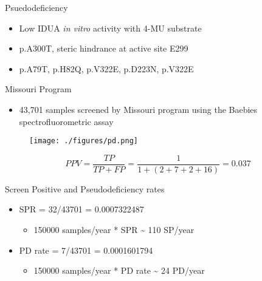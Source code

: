 \documentclass[presentation, smaller]{beamer}
\begin{document}
\begin{frame}[label={sec:orgf42741b}]{Psuedodeficiency}
\begin{itemize}
\item Low IDUA \emph{in vitro} activity with 4-MU substrate
\item p.A300T, steric hindrance at active site E299
\item p.A79T, p.H82Q, p.V322E, p.D223N, p.V322E
\end{itemize}
\end{frame}


\begin{frame}[label={sec:orgba49197}]{Missouri Program}
\begin{itemize}
\item 43,701 samples screened by Missouri program using the Baebies spectrofluorometric assay
\end{itemize}

\begin{figure}[htbp]
\centering
\texttt{[image: ./figures/pd.png]}
\label{fig:org65621ab}
\end{figure}


\[
 PPV = \frac{TP}{TP + FP}  = \frac{1}{1 + (2 + 7 + 2 + 16)} = 0.037
\]

\begin{block}{Screen Positive and Pseudodeficiency rates}
\begin{itemize}
\item SPR = 32/43701 =  0.0007322487
\begin{itemize}
\item 150000 samples/year * SPR \textasciitilde{}  110 SP/year
\end{itemize}
\item PD rate = 7/43701 = 0.0001601794
\begin{itemize}
\item 150000 samples/year * PD rate \textasciitilde{} 24 PD/year
\end{itemize}
\end{itemize}
\end{block}
\end{frame}
\end{document}
